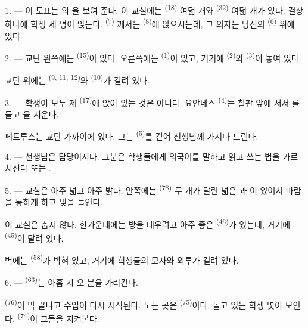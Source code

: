 \VUsaut{3.0mm}

1. --- 이 도표는 의 을 보여 준다. 이 교실에는
 \textsuperscript{(18)} 여덟 개와  \textsuperscript{(32)}
여덟 개가 있다. 걸상 하나에 학생 세 명이 앉는다.  \textsuperscript{(7)}
께서는  \textsuperscript{(8)}에 앉으시는데, 그 의자는 당신의
 \textsuperscript{(6)} 위에 있다.

2. --- 교단 왼쪽에는  \textsuperscript{(15)}이  있다.
오른쪽에는  \textsuperscript{(1)}이 있고, 거기에 
\textsuperscript{(2)}와  \textsuperscript{(3)}이 놓여 있다.

교단 위에는  \textsuperscript{(9, 11,} \textsuperscript{12)}와
 \textsuperscript{(10)}가 걸려 있다.

3. --- 학생이 모두 제  \textsuperscript{(17)}에 앉아 있는 것은 아니다.
요안네스 \textsuperscript{(4)}는 칠판 앞에 서서 를 들고
을 지운다.

페트루스는 교단 가까이에 있다. 그는  \textsuperscript{(5)}를 걷어
선생님께 가져다 드린다.

4. ---  선생님은  담당이시다. 그분은 학생들에게 외국어를
말하고 읽고 쓰는 법을 가르치신다  또는 .

5. --- 교실은 아주 넓고 아주 밝다. 안쪽에는  \textsuperscript{(78)} 두
개가 달린 넓은 과 이 있어서 바람을 통하게 하고 빛을 들인다.

이 교실은 춥지 않다. 한가운데에는 방을 데우려고 아주 좋은 
\textsuperscript{(46)}가 있는데, 거기에  \textsuperscript{(45)}이 달려
있다.

벽에는  \textsuperscript{(58)}가 박혀 있고, 거기에 학생들의 모자와
외투가 걸려 있다.

\VUsaut{5.2mm}
\VUsaut{3.6mm}

6. ---  \textsuperscript{(63)}는 아홉 시 오 분을 가리킨다.

 \textsuperscript{(76)}이 막 끝나고 수업이 다시 시작된다. 노는 곳은
 \textsuperscript{(75)}이다. 놀고 있는 학생 몇이 보인다.
 \textsuperscript{(74)}이 그들을 지켜본다.

